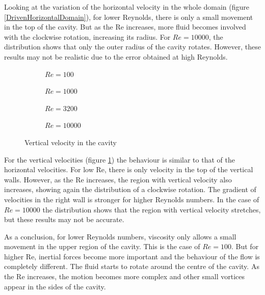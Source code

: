Looking at the variation of the horizontal velocity in the whole domain (figure \ref{DrivenHorizontalDomain}), for lower Reynolds, there is only a small movement in the top of the cavity. But as the Re increases, more fluid becomes involved with the clockwise rotation, increasing its radius. For $Re=10000$, the distribution shows that only the outer radius of the cavity rotates. However, these results may not be realistic due to the error obtained at high Reynolds.

\begin{figure}[h]
	\centering
	\begin{subfigure}{0.5\textwidth}
		\resizebox{1.4\textwidth}{!}{}
		\caption{$Re=100$}
	\end{subfigure}%
	\begin{subfigure}{0.5\textwidth}
		\resizebox{1.4\textwidth}{!}{}
		\caption{$Re=1000$}
	\end{subfigure}
	\begin{subfigure}{0.5\textwidth}
		\resizebox{1.4\textwidth}{!}{}
		\caption{$Re=3200$}
	\end{subfigure}%
	\begin{subfigure}{0.5\textwidth}
		\center
		\resizebox{1.4\textwidth}{!}{}
		\caption{$Re=10000$}
	\end{subfigure}
	\caption{Vertical velocity in the cavity}
	\label{DrivenVerticalDomain}
\end{figure}

For the vertical velocities (figure \ref{DrivenVerticalDomain}) the behaviour is similar to that of the horizontal velocities. For low Re, there is only velocity in the top of the vertical walls. However, as the Re increases, the region with vertical velocity also increases, showing again the distribution of a clockwise rotation. The gradient of velocities in the right wall is stronger for higher Reynolds numbers. In the case of $Re=10000$ the distribution shows that the region with vertical velocity stretches, but these results may not be accurate.

As a conclusion, for lower Reynolds numbers, viscosity only allows a small movement in the upper region of the cavity. This is the case of $Re=100$. But for higher Re, inertial forces become more important and the behaviour of the flow is completely different. The fluid starts to rotate around the centre of the cavity. As the Re increases, the motion becomes more complex and other small vortices appear in the sides of the cavity.

